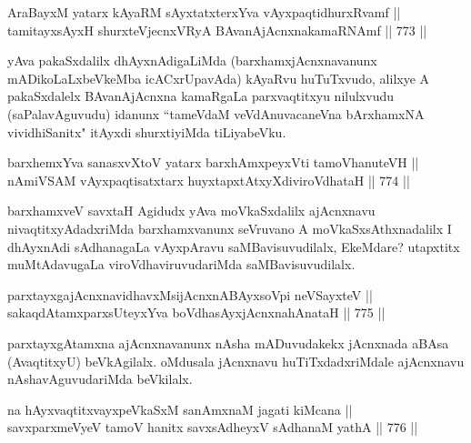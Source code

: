 
\begin{shl}
AraBayxM yatarx kAyaRM sAyxtatxterxYva vAyxpaqtidhurxRvamf || \\
tamitayxsAyxH shurxteVjecnxVRyA BAvanAjAcnxnakamaRNAmf \hfill || 773 ||  
\end{shl}

\begin{artha} 
yAva pakaSxdalilx dhAyxnAdigaLiMda (barxhamxjAcnxnavanunx mADikoLaLxbeVkeMba icACxrUpavAda) kAyaRvu huTuTxvudo, alilxye A pakaSxdalelx BAvanAjAcnxna kamaRgaLa parxvaqtitxyu nilulxvudu (saPalavAguvudu) idanunx ``tameVdaM veVdAnuvacaneVna bArxhamxNA vividhiSanitx" itAyxdi shurxtiyiMda tiLiyabeVku.
\end{artha}


\begin{shl}
barxhemxYva sanasxvXtoV yatarx barxhAmxpeyxVti tamoVhanuteVH || \\
nAmiVSAM vAyxpaqtisatxtarx huyxtapxtAtxyXdiviroVdhataH \hfill || 774 ||  
\end{shl}

\begin{artha} 
barxhamxveV savxtaH Agidudx yAva moVkaSxdalilx ajAcnxnavu nivaqtitxyAdadxriMda barxhamxvanunx seVruvano A moVkaSxsAthxnadalilx I dhAyxnAdi sAdhanagaLa vAyxpAravu saMBavisuvudilalx, EkeMdare? utapxtitx muMtAdavugaLa viroVdhaviruvudariMda saMBavisuvudilalx.
\end{artha}


\begin{shl}
parxtayxgajAcnxnavidhavxMsijAcnxnABAyxsoV\s pi neVSayxteV || \\
sakaqdAtamxparxsUteyxYva boVdhasAyxjAcnxnahAnataH \hfill || 775 ||  
\end{shl}

\begin{artha} 
parxtayxgAtamxna ajAcnxnavanunx nAsha mADuvudakekx jAcnxnada aBAsa (AvaqtitxyU) beVkAgilalx. oMdusala jAcnxnavu huTiTxdadxriMdale ajAcnxnavu nAshavAguvudariMda beVkilalx.
\end{artha}

\begin{shl}
na hAyxvaqtitxvayxpeVkaSxM sanAmxnaM jagati kiMcana || \\
savxparxmeVyeV tamoV hanitx savxsAdheyxV sAdhanaM yathA \hfill || 776 ||  
\end{shl}

